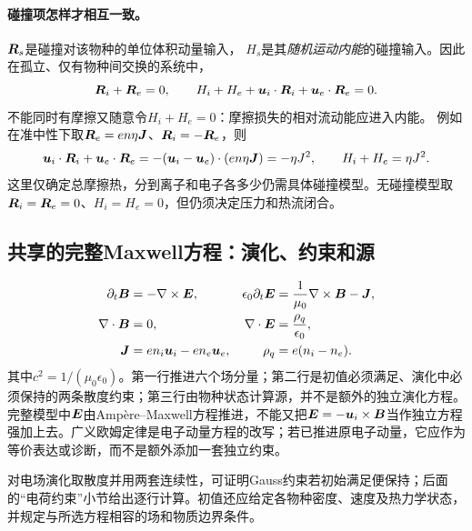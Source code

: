 \paragraph{碰撞项怎样才相互一致。}
$\bm{R}_s$是碰撞对该物种的单位体积动量输入，
$H_s$是其\emph{随机运动内能}的碰撞输入。因此在孤立、仅有物种间交换的系统中，
\begin{equation}
 \bm{R}_i+\bm{R}_e=0,\qquad
 H_i+H_e+\bm{u}_i\cdot\bm{R}_i+\bm{u}_e\cdot\bm{R}_e=0.
 \label{eq:twofluid-collision-consistency}
\end{equation}
不能同时有摩擦又随意令$H_i+H_e=0$：摩擦损失的相对流动能应进入内能。
例如在准中性下取$\bm{R}_e=en\eta\bm{J}$、$\bm{R}_i=-\bm{R}_e$，则
\begin{equation}
 \bm{u}_i\cdot\bm{R}_i+\bm{u}_e\cdot\bm{R}_e
 =-(\bm{u}_i-\bm{u}_e)\cdot(en\eta\bm{J})=-\eta J^2,
 \qquad H_i+H_e=\eta J^2.
\end{equation}
这里仅确定总摩擦热，分到离子和电子各多少仍需具体碰撞模型。无碰撞模型取$\bm{R}_i=\bm{R}_e=0$、$H_i=H_e=0$，但仍须决定压力和热流闭合。

\subsection{共享的完整Maxwell方程：演化、约束和源}
\begin{align}
 \partial_t\bm{B}&=-\nabla\times\bm{E},
 &\epsilon_0\partial_t\bm{E}&=\frac1{\mu_0}\nabla\times\bm{B}-\bm{J},
 \label{eq:twofluid-maxwell-evolve}\\
 \nabla\cdot\bm{B}&=0,
 &\nabla\cdot\bm{E}&=\frac{\rho_q}{\epsilon_0},
 \label{eq:twofluid-maxwell-constraints}\\
 \bm{J}&=en_i\bm{u}_i-en_e\bm{u}_e,
 &\rho_q&=e(n_i-n_e).
 \label{eq:twofluid-sources}
\end{align}
其中$c^2=1/(\mu_0\epsilon_0)$。第一行推进六个场分量；第二行是初值必须满足、演化中必须保持的两条散度约束；第三行由物种状态计算源，并不是额外的独立演化方程。
完整模型中$\bm{E}$由Ampère--Maxwell方程推进，不能又把$\bm{E}=-\bm{u}_i\times\bm{B}$当作独立方程强加上去。广义欧姆定律是电子动量方程的改写；若已推进原电子动量，它应作为等价表达或诊断，而不是额外添加一套独立约束。

对电场演化取散度并用两套连续性，可证明Gauss约束若初始满足便保持；后面的“电荷约束”小节给出逐行计算。初值还应给定各物种密度、速度及热力学状态，并规定与所选方程相容的场和物质边界条件。

